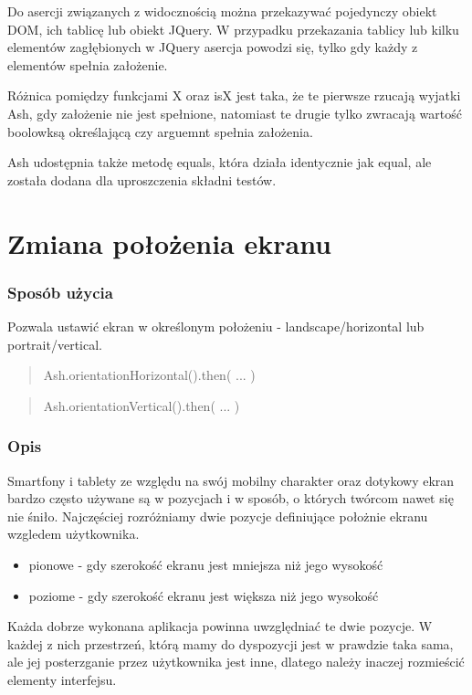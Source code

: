 \documentclass[brudnopis]{xmgr}
\begin{document}
Do asercji związanych z widocznością można przekazywać pojedynczy obiekt DOM, ich tablicę lub obiekt JQuery. W przypadku przekazania tablicy lub kilku elementów zagłębionych w JQuery asercja powodzi się, tylko gdy każdy z elementów spełnia założenie. 

Różnica pomiędzy funkcjami X oraz isX jest taka, że te pierwsze rzucają wyjatki Ash, gdy założenie nie jest spełnione, natomiast te drugie tylko zwracają wartość boolowksą określającą czy arguemnt spełnia założenia.  

Ash udostępnia także metodę equals, która działa identycznie jak equal, ale została dodana dla uproszczenia składni testów.

\section{Zmiana położenia ekranu}

\subsubsection{Sposób użycia}
Pozwala ustawić ekran w określonym położeniu - landscape/horizontal lub portrait/vertical.

\begin{quote}
Ash.orientationHorizontal().then( ... ) 
\end{quote}

\begin{quote}
Ash.orientationVertical().then( ... ) 
\end{quote}

\subsubsection{Opis}

Smartfony i tablety ze względu na swój mobilny charakter oraz dotykowy ekran bardzo często używane są w pozycjach i w sposób, o których twórcom nawet się nie śniło. Najczęściej rozróżniamy dwie pozycje definiujące położnie ekranu wzgledem użytkownika. 

\begin{itemize}
  \item pionowe - gdy szerokość ekranu jest mniejsza niż jego wysokość
  \item poziome - gdy szerokość ekranu jest większa niż jego wysokość
\end{itemize}

Każda dobrze wykonana aplikacja powinna uwzględniać te dwie pozycje. W każdej z nich przestrzeń, którą mamy do dyspozycji jest w prawdzie taka sama, ale jej posterzganie przez użytkownika jest inne, dlatego należy inaczej rozmieścić elementy interfejsu.  
\end{document}
